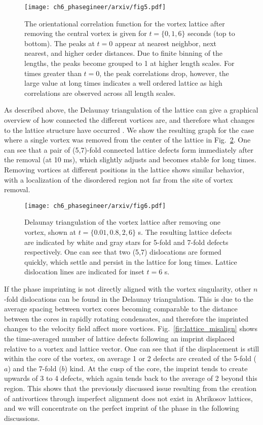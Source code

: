 \begin{figure}[h!]\centering
    \texttt{[image: ch6\_phasegineer/arxiv/fig5.pdf]}
    \caption{The orientational correlation function for the vortex lattice after removing the central vortex is given for $t=\{0,1,6\}$ seconds (top to bottom). The peaks at $t=0$ appear at nearest neighbor, next nearest, and higher order distances. Due to finite binning of the lengths, the peaks become grouped to 1 at higher length scales. For times greater than $t=0$, the peak correlations drop, however, the large value at long times indicates a well ordered lattice as high correlations are observed across all length scales.}\label{fig:g6}
\end{figure}

As described above, the Delaunay triangulation of the lattice can give a graphical overview of how connected the different vortices are, and therefore what changes to the lattice structure have occurred \cite{Guillamon_nat_2014}. We show the resulting graph for the case where a single vortex was removed from the center of the lattice in Fig.~\ref{fig:deltri_1vtx}. One can see that a pair of (5,7)-fold connected lattice defects form immediately after the removal (at 10 ms), which slightly adjusts and becomes stable for long times. Removing vortices at different positions in the lattice shows similar behavior, with a localization of the disordered region not far from the site of vortex removal.

\begin{figure}[h!]\centering
    \texttt{[image: ch6\_phasegineer/arxiv/fig6.pdf]}
    \caption{Delaunay triangulation of the vortex lattice after removing one vortex, shown at $t=\{0.01,0.8,2,6\}$ s. The resulting lattice defects are indicated by white and gray stars for 5-fold and 7-fold defects respectively. One can see that two (5,7) dislocations are formed quickly, which settle and persist in the lattice for long times. Lattice dislocation lines are indicated for inset $t=6$ s.}\label{fig:deltri_1vtx}
\end{figure}

If the phase imprinting is not directly aligned with the vortex singularity, other $n$-fold dislocations can be found in the Delaunay triangulation. This is due to the average spacing between vortex cores becoming comparable to the distance between the cores in rapidly rotating condensates, and therefore the imprinted changes to the velocity field affect more vortices. Fig.~\ref{fig:lattice_misalign} shows the time-averaged number of lattice defects following an imprint displaced relative to a vortex and lattice vector. One can see that if the displacement is still within the core of the vortex, on average 1 or 2 defects are created of the 5-fold ($a$) and the 7-fold ($b$) kind. At the cusp of the core, the imprint tends to create upwards of 3 to 4 defects, which again tends back to the average of 2 beyond this region. This shows that the previously discussed issue resulting from the creation of antivortices through imperfect alignment does not exist in Abrikosov lattices, and we will concentrate on the perfect imprint of the phase in the following discussions.

